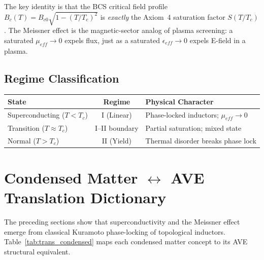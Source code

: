 \noindent The key identity is that the BCS critical field profile $B_c(T) = B_{c0}\sqrt{1-(T/T_c)^2}$ is \emph{exactly} the Axiom~4 saturation factor $S(T/T_c)$. The Meissner effect is the magnetic-sector analog of plasma screening: a saturated $\mu_{eff} \to 0$ expels flux, just as a saturated $\epsilon_{eff} \to 0$ expels E-field in a plasma.

\subsection*{Regime Classification}
\begin{center}
\small
\renewcommand{\arraystretch}{1.2}
\begin{tabular}{lcl}
\toprule
\textbf{State} & \textbf{Regime} & \textbf{Physical Character} \\
\midrule
Superconducting ($T < T_c$) & I (Linear) & Phase-locked inductors; $\mu_{eff} \to 0$ \\
Transition ($T \approx T_c$)      & I--II boundary & Partial saturation; mixed state \\
Normal ($T > T_c$)                 & II (Yield) & Thermal disorder breaks phase lock \\
\bottomrule
\end{tabular}
\end{center}

\section{Condensed Matter $\leftrightarrow$ AVE Translation Dictionary}
\label{sec:cm_ave_translation}

The preceding sections show that superconductivity and the Meissner effect emerge from classical Kuramoto phase-locking of topological inductors.  Table~\ref{tab:trans_condensed} maps each condensed matter concept to its AVE structural equivalent.


